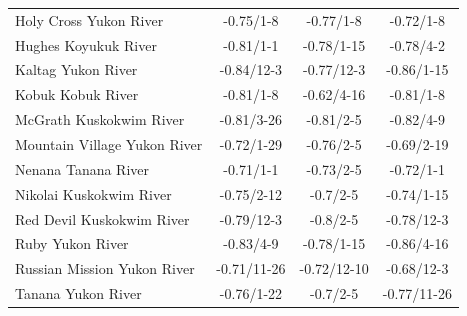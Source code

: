 \documentclass[12pts,draft]{AR_analysis_}
\begin{document}
\begin{table}[h]
\begin{tabular}{lccc}
	Holy Cross Yukon River        &    -0.75/1-8 &    -0.77/1-8 &    -0.72/1-8 \\
	Hughes Koyukuk River          &    -0.81/1-1 &   -0.78/1-15 &    -0.78/4-2 \\
	Kaltag Yukon River            &   -0.84/12-3 &   -0.77/12-3 &   -0.86/1-15 \\
	Kobuk Kobuk River             &    -0.81/1-8 &   -0.62/4-16 &    -0.81/1-8 \\
	McGrath Kuskokwim River       &   -0.81/3-26 &    -0.81/2-5 &    -0.82/4-9 \\
	Mountain Village Yukon River  &   -0.72/1-29 &    -0.76/2-5 &   -0.69/2-19 \\
	Nenana Tanana River           &    -0.71/1-1 &    -0.73/2-5 &    -0.72/1-1 \\
	Nikolai Kuskokwim River       &   -0.75/2-12 &     -0.7/2-5 &   -0.74/1-15 \\
	Red Devil Kuskokwim River     &   -0.79/12-3 &     -0.8/2-5 &   -0.78/12-3 \\
	Ruby Yukon River              &    -0.83/4-9 &   -0.78/1-15 &   -0.86/4-16 \\
	Russian Mission Yukon River   &  -0.71/11-26 &  -0.72/12-10 &   -0.68/12-3 \\
	Tanana Yukon River            &   -0.76/1-22 &     -0.7/2-5 &  -0.77/11-26 \\
    \bottomrule
    \end{tabular}
\end{table}
\end{document}
